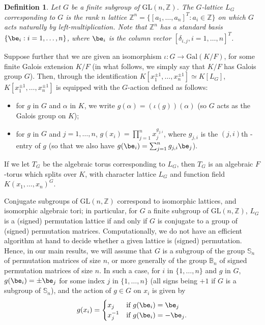 \documentclass[12pt]{article}
\theoremstyle{plain}
\newtheorem{definition}[theorem]{Definition}
\newcommand{\Z}{\ensuremath{\mathbb{Z}}}
\begin{document}
\begin{definition}\label{Assumption}
  Let $G$ be a finite subgroup of $\mathrm{GL}(n,\Z)$.  The
  $G$-lattice $L_G$ corresponding to $G$ is the rank $n$ lattice
  $\Z^n=\{[a_1,\dots,a_n]^T: a_i\in \Z\}$ on which $G$ acts naturally by left-multiplication.
  Note that $\Z^n$ has a standard basis $\{\be_i: i=1,\dots,n\}$, 
  where $\be_i$ is the column vector
  $[\delta_{i,j}, i=1,\dots,n]^T$.
\end{definition}

Suppose further that we are given an isomorphism $\iota: G \to
\mathrm{Gal}(K/F)$, for some finite Galois extension $K/F$ (in what
follows, we simply say that $K/F$ has Galois group $G$). Then, through
the identification $K[x_1^{\pm 1}, \ldots , x_n^{\pm 1}]\simeq K[L_G]$,
$K[x_1^{\pm 1}, \ldots , x_n^{\pm 1}]$ is equipped with the $G$-action
defined as follows:
\begin{itemize}
\item for $g$ in $G$ and $\alpha$ in $K$, we write
  $g(\alpha)=(\iota(g))(\alpha)$ (so $G$ acts as the Galois group on
  $K$);
\item for $g$ in $G$ and $j=1,\dots,n$, $g(x_i) = \prod_{j=1}^{n}
  x_j^{g_{j,i}}$, where $g_{j,i}$ is the $(j,i)$th -entry of $g$
 (so that we also have $g(\be_i) =
  \sum_{j=1}^{n} g_{j,i}\be_j$).
\end{itemize}
If we let $T_G$ be the algebraic torus corresponding to $L_G$, then
$T_G$ is an algebraic $F$-torus which splits over $K$, with character
lattice $L_G$ and function field $K(x_1,\dots,x_n)^G$.

Conjugate subgroups of $\mathrm{GL}(n,\Z)$ correspond to isomorphic
lattices, and isomorphic algebraic tori; in particular, for $G$ a
finite subgroup of $\mathrm{GL}(n,\mathbb{Z})$, $L_G$ is a (signed)
permutation lattice if and only if $G$ is conjugate to a group of
(signed) permutation matrices.  Computationally, we do not have an
efficient algorithm at hand to decide whether a given lattice is
(signed) permutation. Hence, in our main results, we will assume that
$G$ is a subgroup of the group $\mathbb{S}_n$ of permutation matrices
of size $n$, or more generally of the group $\mathbb{B}_n$ of signed
permutation matrices of size $n$.  In such a case, for $i$ in
$\{1,\dots,n\}$ and $g$ in $G$, $g(\be_i)=\pm \be_j$ for some index
$j$ in $\{1,\dots,n\}$ (all signs being $+1$ if $G$ is a subgroup of
$\mathbb{S}_n$), and the action of $g \in G$ on $x_i$ is given
by $$g(x_i) = \begin{cases} x_j & \text{if~} g(\be_i) = \be_j
  \\ x^{-1}_j & \text{if~} g(\be_i) = -\be_j. \end{cases}$$
\end{document}
